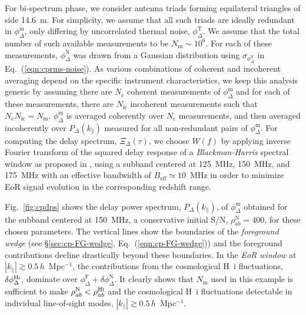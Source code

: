 \documentclass[
reprint,
superscriptaddress,
amsmath,
amssymb,
aps,
prd
]{revtex4-1}
\begin{document}
For bi-spectrum phase, we consider antenna triads forming equilateral triangles of side 14.6~m. For simplicity, we assume that all such triads are ideally redundant in $\phi_\Delta^\textrm{m}$, only differing by uncorrelated thermal noise, $\phi_\Delta^\textrm{T}$. We assume that the total number of such available measurements to be $N_\textrm{m} \sim 10^6$. For each of these measurements, $\phi_\Delta^\textrm{N}$ was drawn from a Gaussian distribution using $\sigma_{\phi_\Delta^\textrm{N}}$ in Eq.~(\ref{eqn:cprms-noise}). As various combinations of coherent and incoherent averaging depend on the specific instrument characteristics, we keep this analysis generic by assuming there are $N_\textrm{c}$ coherent measurements of $\phi_\Delta^\textrm{m}$ and for each of these measurements, there are $N_\textrm{ic}$ incoherent measurements such that $N_\textrm{c}N_\textrm{ic}=N_\textrm{m}$. $\phi_\Delta^\textrm{m}$ is averaged coherently over $N_\textrm{c}$ measurements, and then averaged incoherently over $P_\Delta(k_\parallel)$ measured for all non-redundant pairs of $\phi_\Delta^\textrm{m}$. For computing the delay spectrum, $\Xi_\Delta(\tau)$, we choose $W(f)$ by applying inverse Fourier transform of the squared delay response of a {\it Blackman-Harris} spectral window \cite{har78} as proposed in \cite{thy16}, using a subband centered at 125~MHz, 150~MHz, and 175~MHz with an effective bandwidth of $B_\textrm{eff}\simeq 10$~MHz in order to minimize EoR signal evolution in the corresponding redshift range.

Fig.~\ref{fig:cpdps} shows the delay power spectrum, $P_\Delta(k_\parallel)$, of $\phi_\Delta^\textrm{m}$ obtained for the subband centered at 150~MHz, a conservative initial S/N, $\rho_{ab}^\textrm{N}=400$,  for these chosen parameters. The vertical lines show the boundaries of the {\it foreground wedge} (see \S\ref{sec:cp-FG-wedge}, Eq.~(\ref{eqn:cp-FG-wedge})) and the foreground contributions decline drastically beyond these boundaries. In the {\it EoR window} at $|k_\parallel| \gtrsim 0.5\,h$~Mpc$^{-1}$, the contributions from the cosmological H~{\sc i} fluctuations, $\delta\phi_\Delta^\textrm{H{\sc i}}$, dominate over $\phi_\Delta^\textrm{F} + \delta\phi_\Delta^\textrm{N}$. It clearly shows that $N_\textrm{m}$ used in this example is sufficient to make $\rho_{ab}^\textrm{N} < \rho_{ab}^\textrm{H{\sc i}}$ and the cosmological H~{\sc i} fluctuations detectable in individual line-of-sight modes, $|k_\parallel| \gtrsim 0.5\,h$~Mpc$^{-1}$. 
\end{document}
